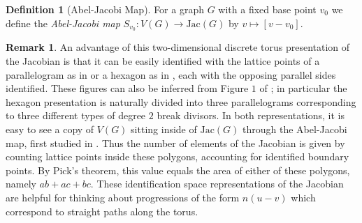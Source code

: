 \documentclass[11pt]{article}
\theoremstyle{definition}
\newtheorem{defi}[theo]{Definition}
\newtheorem{rema}[theo]{Remark}
\numberwithin{equation}{section}
\newcommand{\jac}[1]{\mathrm{Jac}\left({#1}\right)}
\begin{document}
\begin{defi}[Abel-Jacobi Map]
For a graph $G$ with a fixed base point $v_0$ we define the \textit{Abel-Jacobi map} $S_{v_0}:V(G)\to \jac{G}$ by $v \mapsto [v-v_0]$.
\end{defi}

\begin{rema}
    An advantage of this two-dimensional discrete torus presentation of the Jacobian is that it can be easily identified with the lattice points of a parallelogram as in  or a hexagon as in , each with the opposing parallel sides identified.
    These figures can also be inferred from Figure $1$ of \cite{ABKS}; in particular the hexagon presentation is naturally divided into three parallelograms corresponding to three different types of degree $2$ break divisors.
    In both representations, it is easy to see a copy of $V(G)$ sitting inside of $\jac{G}$ through the Abel-Jacobi map, first studied in \cite{BakNor07}.
    Thus the number of elements of the Jacobian is given by counting lattice points inside these polygons, accounting for identified boundary points. By Pick's theorem, this value equals the area of either of these polygons, namely $ab+ ac+bc$. These identification space representations of the Jacobian are helpful for thinking about progressions of the form $n(u-v)$ which correspond to straight paths along the torus. 
\end{rema}
\end{document}
